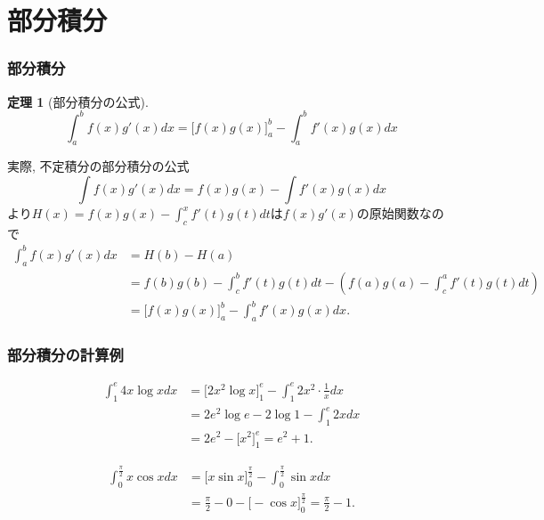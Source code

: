 \documentclass[dvipdfmx,cjk,10.2pt]{beamer}
\theoremstyle{definition}
\newtheorem{Thm}{定理}[section]
\begin{document}


\section{部分積分}

\begin{frame}
\frametitle{部分積分}

\vspace{-2.7mm}

\begin{Thm}[部分積分の公式] \vspace{-1mm}
$$
\int_a^b f(x)g'(x)dx = \big[f(x)g(x)\big]_a^b - \int_a^b f'(x)g(x)dx
$$
\end{Thm} \vspace{-0.5mm}
実際, 不定積分の部分積分の公式
$$
\int f(x)g'(x)dx = f(x)g(x) - \int f'(x)g(x)dx
$$
より$H(x)=f(x)g(x) - \int_c^x f'(t)g(t)dt$は$ f(x)g'(x)$の原始関数なので \vspace{-1mm}
\begin{align*}
\int_a^b f(x)g'(x)dx &= H(b)-H(a) \\
& = f(b)g(b) - \int_c^b f'(t)g(t)dt - (f(a)g(a) - \int_c^a f'(t)g(t)dt) \\
& = \big[f(x)g(x)\big]_a^b - \int_a^b f'(x)g(x)dx. 
\end{align*}


\end{frame}



\begin{frame}
\frametitle{部分積分の計算例}


\begin{align*}
\int_1^{e} 4 x \log x dx & = \big[ 2x^2 \log x \big]_1^{e}- \int_1^e 2x^2 \cdot \frac{1}{x}dx \\
& = 2e^2 \log e - 2 \log 1 - \int_1^e2xdx \\
& = 2e^2-\big[x^2\big]_1^e = e^2+1. 
\end{align*}

\begin{align*}
\int_0^{\frac{\pi}{2}} x \cos x  dx & = \big[ x \sin x \big]_0^{\frac{\pi}{2}} - \int_0^{\frac{\pi}{2}} \sin x dx \\
& = \frac{\pi}{2}-0-\big[-\cos x \big]_0^{\frac{\pi}{2}}= \frac{\pi}{2}-1. 
\end{align*}

\end{frame}
\end{document}
